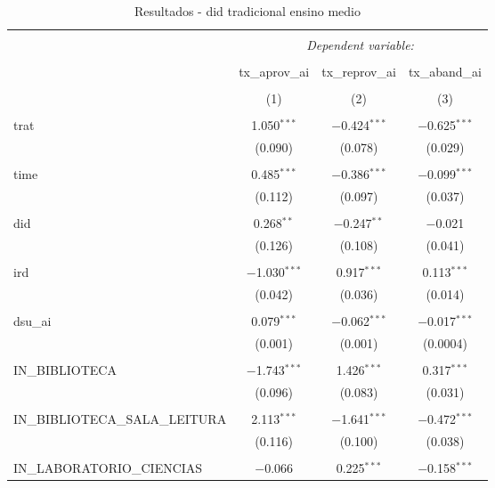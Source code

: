 
\begin{table}[!htbp] \centering 
  \caption{Resultados - did tradicional ensino medio} 
  \label{} 
\begin{tabular}{@{\extracolsep{5pt}}lccc} 
\\[-1.8ex]\hline 
\hline \\[-1.8ex] 
 & \multicolumn{3}{c}{\textit{Dependent variable:}} \\ 
\cline{2-4} 
\\[-1.8ex] & tx\_aprov\_ai & tx\_reprov\_ai & tx\_aband\_ai \\ 
\\[-1.8ex] & (1) & (2) & (3)\\ 
\hline \\[-1.8ex] 
 trat & 1.050$^{***}$ & $-$0.424$^{***}$ & $-$0.625$^{***}$ \\ 
  & (0.090) & (0.078) & (0.029) \\ 
  & & & \\ 
 time & 0.485$^{***}$ & $-$0.386$^{***}$ & $-$0.099$^{***}$ \\ 
  & (0.112) & (0.097) & (0.037) \\ 
  & & & \\ 
 did & 0.268$^{**}$ & $-$0.247$^{**}$ & $-$0.021 \\ 
  & (0.126) & (0.108) & (0.041) \\ 
  & & & \\ 
 ird & $-$1.030$^{***}$ & 0.917$^{***}$ & 0.113$^{***}$ \\ 
  & (0.042) & (0.036) & (0.014) \\ 
  & & & \\ 
 dsu\_ai & 0.079$^{***}$ & $-$0.062$^{***}$ & $-$0.017$^{***}$ \\ 
  & (0.001) & (0.001) & (0.0004) \\ 
  & & & \\ 
 IN\_BIBLIOTECA & $-$1.743$^{***}$ & 1.426$^{***}$ & 0.317$^{***}$ \\ 
  & (0.096) & (0.083) & (0.031) \\ 
  & & & \\ 
 IN\_BIBLIOTECA\_SALA\_LEITURA & 2.113$^{***}$ & $-$1.641$^{***}$ & $-$0.472$^{***}$ \\ 
  & (0.116) & (0.100) & (0.038) \\ 
  & & & \\ 
 IN\_LABORATORIO\_CIENCIAS & $-$0.066 & 0.225$^{***}$ & $-$0.158$^{***}$ \\ 

\end{tabular}
\end{table}
